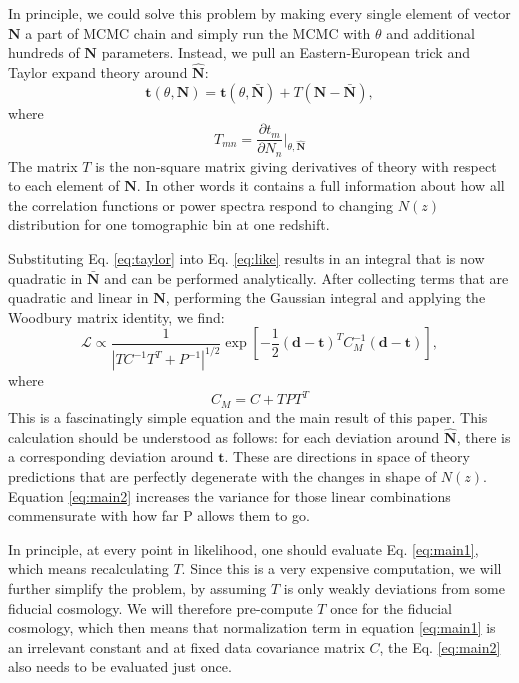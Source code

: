 \documentclass[a4paper,11pt]{article}
\newcommand{\vd}{\mathbf{d}}
\newcommand{\vt}{\mathbf{t}}
\newcommand{\vN}{\mathbf{N}}
\begin{document}
  In principle, we could solve this problem by making every single element of vector $\vN$ a part of MCMC chain and simply run the MCMC with $\theta$ and additional hundreds of $\vN$ parameters. Instead, we pull an Eastern-European trick and Taylor expand theory around $\hat{\vN}$:
  \begin{equation}
    \vt(\theta,\vN) = \vt(\theta,\bar{\vN}) + T \left(\vN - \bar{\vN} \right), \label{eq:taylor}
  \end{equation}
  where
  \begin{equation}
    T_{mn} = \frac{\partial t_m}{\partial N_n} \bigg|_{\theta,\hat{\vN}}
  \end{equation}
  The matrix $T$ is the non-square matrix giving derivatives of theory with respect to each element of $\vN$. In other words it contains a full information about how all the correlation functions or power spectra respond to changing $N(z)$ distribution for one tomographic bin at one redshift.

  Substituting Eq. \ref{eq:taylor} into Eq. \ref{eq:like} results in an integral that is now quadratic in $\bar{\vN}$ and can be performed analytically. After collecting terms that are quadratic and linear in $\vN$, performing the Gaussian integral and applying the Woodbury matrix identity, we find:
  \begin{equation}
    \mathcal{L} \propto \frac{1}{|T C^{-1} T^T +P^{-1} |^{1/2}} \exp\left [-\frac{1}{2} (\vd-\vt)^T C_M^{-1} (\vd-\vt) \right], \label{eq:main1}
  \end{equation}
  where
  \begin{equation}
    C_M = C + T PT^T \label{eq:main2}
  \end{equation}
  This is a fascinatingly simple equation and the main result of this paper. This calculation should be understood as follows: for each deviation around $\hat{\vN}$, there is a corresponding deviation around $\vt$. These are directions in space of theory predictions that are perfectly degenerate with the changes in shape of $N(z)$.  Equation \ref{eq:main2}  increases the variance for those linear combinations commensurate with how far P allows them to go.

  In principle, at every point in likelihood, one should evaluate Eq. \ref{eq:main1}, which means recalculating $T$. Since this is a very expensive computation, we will further simplify the problem, by assuming $T$ is only weakly deviations from some fiducial cosmology. We will therefore pre-compute $T$ once for the fiducial cosmology, which then means that normalization term in equation \ref{eq:main1} is an irrelevant constant and at fixed data covariance matrix $C$, the Eq. \ref{eq:main2} also needs to be evaluated just once.
\end{document}
